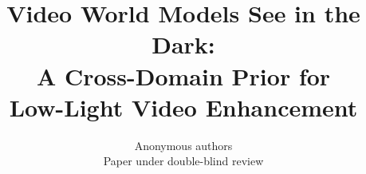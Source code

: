 \documentclass{article}
\title{Video World Models See in the Dark:\\A Cross-Domain Prior for\\Low-Light Video Enhancement}
\author{Anonymous authors\\Paper under double-blind review}
\begin{document}
\maketitle









\clearpage
{}\label{after-main-text}




\clearpage
\appendix

\end{document}
